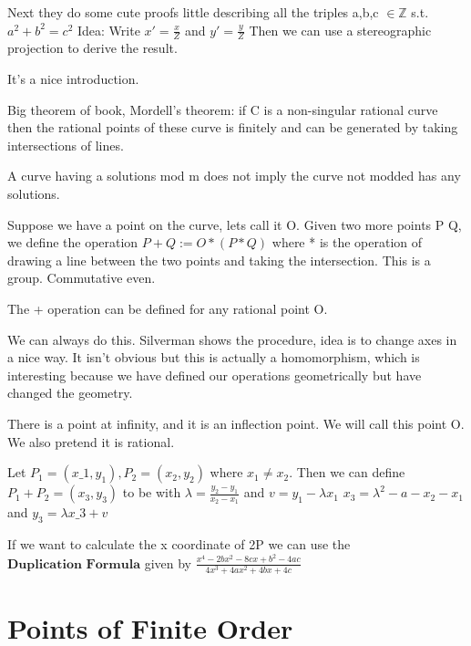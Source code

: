 \documentclass{article}
\begin{document}
Next they do some cute proofs little describing all the triples a,b,c $\in \mathbb{Z}$ s.t. $a^2 + b^2 = c^2$
Idea:
Write $x' = \frac{x}{Z}$ and $y' = \frac{y}{Z}$
Then we can use a stereographic projection to derive the result.

It's a nice introduction.


Big theorem of book, Mordell's theorem: if C is a non-singular rational curve then the rational points of these curve is finitely and can be generated by taking intersections of lines. 



A curve having a solutions mod m does not imply the curve not modded has any solutions. 

Suppose we have a point on the curve, lets call it O. Given two more points P Q, we define the operation $P + Q := O * (P * Q)$ where * is the operation of drawing a line between the two points and taking the intersection. This is a group. Commutative even.


The + operation can be defined for any rational point O. 


We can always do this. Silverman shows the procedure, idea is to change axes in a nice way. It isn't obvious but this is actually a homomorphism, which is interesting because we have defined our operations geometrically but have changed the geometry. 



There is a point at infinity, and it is an inflection point. We will call this point O. We also pretend it is rational. 

Let $P_1 = (x\_1 , y_1), P_2 = (x_2, y_2)$ where $x_1 \neq x_2$. Then we can define $P_1 + P_2 = (x_3, y_3)$ to be with $\lambda = \frac{y_2 - y_1}{x_2 - x_1}$ and $v = y_1 - \lambda x_1$ $x_3 = \lambda^2 - a - x_2 - x_1$ and $y_3 = \lambda x\_3 + v$ 

If we want to calculate the x coordinate of 2P we can use the $\textbf{Duplication Formula}$ given by $\frac{x^4 - 2 b x^2 - 8cx + b^2 - 4ac}{4x^3 + 4ax^2 + 4bx + 4c}$
 
 
 \section{Points of Finite Order}
 
\end{document}
